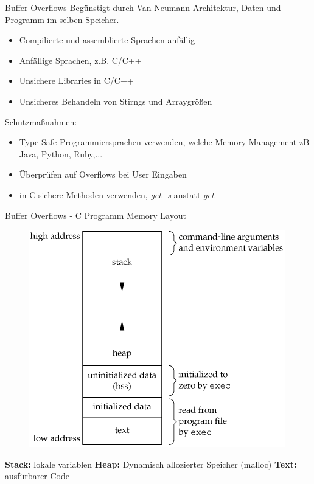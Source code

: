 \documentclass[10pt]{beamer}
\begin{document}
\begin{frame}[fragile]{Buffer Overflows}
  Beg\"unstigt durch Van Neumann Architektur, Daten und Programm im selben Speicher.
  \begin{itemize}
    \item Compilierte und assemblierte Sprachen anf\"allig
    \item Anf\"allige Sprachen, z.B. C/C++
    \item Unsichere Libraries in C/C++
    \item Unsicheres Behandeln von Stirngs und Arraygr\"o{\ss}en
  \end{itemize}

  Schutzma{\ss}nahmen:
  \begin{itemize}
    \item Type-Safe Programmiersprachen verwenden, welche Memory Management zB Java, Python, Ruby,...
    \item \"Uberpr\"ufen auf Overflows bei User Eingaben
    \item in C sichere Methoden verwenden, \textit{get\_s} anstatt \textit{get}.
  \end{itemize}
\end{frame}

\begin{frame}[fragile]{Buffer Overflows - C Programm Memory Layout}
  \begin{minipage}{0.5\textwidth}
    \begin{figure}[H]
      \includegraphics[scale=0.50]{memory_layout}
    \end{figure}
  \end{minipage} \hfill
  \begin{minipage}{0.3\textwidth}
    \textbf{Stack:} lokale variablen \newline \newline
    \textbf{Heap:} Dynamisch allozierter Speicher (malloc) \newline \newline
    \textbf{Text:} ausf\"urbarer Code \newline
  \end{minipage}
\end{frame}
\end{document}
